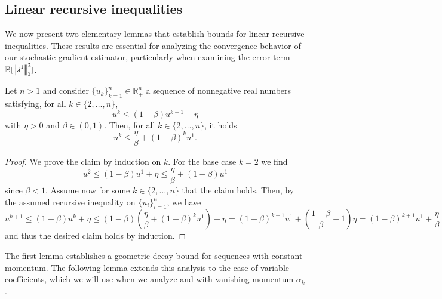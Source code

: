 \begin{toappendix}
\subsection{Linear recursive inequalities}
We now present two elementary lemmas that establish bounds for linear recursive inequalities. These results are essential for analyzing the convergence behavior of our stochastic gradient estimator, particularly when examining the error term $\mathbb{E}[\left\Vert{\lambda^k}\right\Vert_2^2]$.
\begin{lemma}\label{lem:recursive_geometric}
    Let $n>1$ and consider $\{u_k\}_{k=1}^n\in\mathbb{R}_+^n$ a sequence of nonnegative real numbers satisfying, for all $k\in\{2,\ldots,n\}$,
    \begin{equation*}
        u^k\leq (1-\beta) u^{k-1} + \eta
    \end{equation*}
    with $\eta>0$ and $\beta\in(0,1)$.
    Then, for all $k\in\{2,\ldots,n\}$, it holds
    \begin{equation*}
        u^k\leq \frac{\eta}{\beta} + (1-\beta)^ku^1.
    \end{equation*}
\end{lemma}
\begin{proof}
    We prove the claim by induction on $k$. For the base case $k=2$ we find
    \begin{equation*}
        u^2 \leq (1-\beta)u^1 + \eta \leq \frac{\eta}{\beta} + (1-\beta)u^1
    \end{equation*}
    since $\beta<1$.
    Assume now for some $k\in\{2,\ldots,n\}$ that the claim holds. Then, by the assumed recursive inequality on $\{u_i\}_{i=1}^n$, we have
    \begin{equation*}
        u^{k+1} \leq (1-\beta)u^k + \eta \leq (1-\beta)\left(\frac{\eta}{\beta} + (1-\beta)^ku^1\right) + \eta = (1-\beta)^{k+1}u^1 + \left(\frac{1-\beta}{\beta} + 1\right)\eta = (1-\beta)^{k+1}u^1 + \frac{\eta}{\beta}
    \end{equation*}
    and thus the desired claim holds by induction.
\end{proof}

The first lemma establishes a geometric decay bound for sequences with constant momentum. The following lemma extends this analysis to the case of variable coefficients, which we will use when we analyze  and  with vanishing momentum $\alpha_k$.


\end{toappendix}
